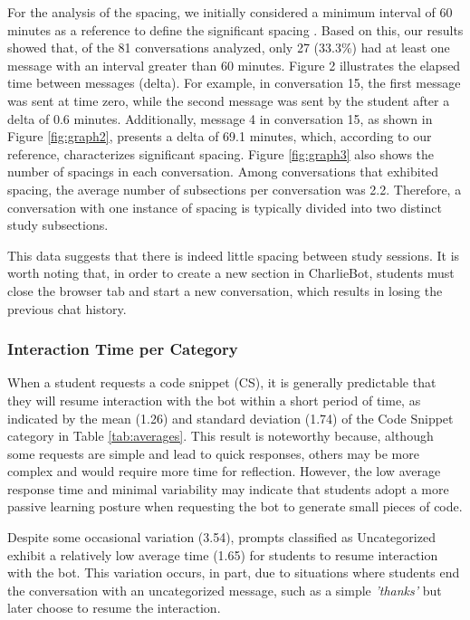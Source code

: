 \documentclass[a4paper,twoside]{article}
\begin{document}
For the analysis of the spacing, we initially considered a minimum interval of
60 minutes as a reference to define the significant spacing \citep{Gadella24}.
Based on this, our results showed that, of the 81 conversations analyzed, only
27 (33.3\%) had at least one message with an interval greater than 60 minutes.
Figure 2 illustrates the elapsed time between messages (delta). For example,
in conversation 15, the first message was sent at time zero, while the second
message was sent by the student after a delta of 0.6 minutes. Additionally,
message 4 in conversation 15, as shown in Figure \ref{fig:graph2}, presents a
delta of 69.1 minutes, which, according to our reference, characterizes
significant spacing. Figure \ref{fig:graph3} also shows the number of spacings
in each conversation. Among conversations that exhibited spacing, the
average number of subsections per conversation was 2.2. Therefore, a
conversation with one instance of spacing is typically divided into two distinct
study subsections.

This data suggests that there is indeed little spacing between study sessions.
It is worth noting that, in order to create a new section in CharlieBot,
students must close the browser tab and start a new conversation, which results
in losing the previous chat history.

\subsubsection{Interaction Time per Category}

When a student requests a code snippet (CS), it is generally predictable that
they will resume interaction with the bot within a short period of time, as
indicated by the mean (1.26) and standard deviation (1.74) of the Code Snippet
category in Table \ref{tab:averages}. This result is noteworthy because,
although some requests are simple and lead to quick responses, others may be
more complex and would require more time for reflection. However, the low
average response time and minimal variability may indicate that students adopt a
more passive learning posture when requesting the bot to generate small pieces
of code.

Despite some occasional variation (3.54), prompts classified as Uncategorized
exhibit a relatively low average time (1.65) for students to resume interaction
with the bot. This variation occurs, in part, due to situations where students
end the conversation with an uncategorized message, such as a simple
\textit{'thanks'} but later choose to resume the interaction.
\end{document}
